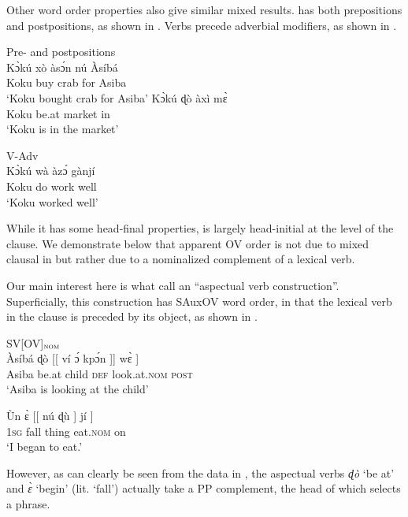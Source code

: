 \documentclass[output=paper,newtxmath,modfonts,nonflat,draftmode]{langsci/langscibook}
\begin{document}
Other word order properties also give similar mixed results.  has both prepositions and postpositions, as shown in . Verbs precede adverbial modifiers, as shown in . 

\ea
\ea \label{ex:Fongbe-PP} {Pre- and postpositions}\\
 \gll K{\`ɔ}kú xò às{\'ɔ}n nú  Àsíbá \\
Koku buy crab for Asiba \\
\glt `Koku bought crab for Asiba' \hfill \citep[][302]{lefebvre2002}
\ex \gll K{\`ɔ}kú ɖò àxì m{\`ɛ}\\
Koku be.at market in \\
\glt `Koku is in the market' \hfill \citep[][325]{lefebvre2002}
\z
\z

\ea \label{ex:Fongbe-Adv}
{V-Adv}\\
\gll K{{\`ɔ}kú} wà {àz{\'ɔ}} gànjí \\
Koku do work well \\
\glt `Koku worked well' \hfill \citep[][381]{lefebvre2002}
\z

While it has some head-final properties,  is largely head-initial at the level of the clause. We demonstrate below that apparent OV order is not due to mixed clausal  in  but rather due to a nominalized complement of a lexical verb.

Our main interest here is what \citet{lefebvre2002} call an ``aspectual verb construction''. Superficially, this construction has SAuxOV word order, in that the lexical verb in the clause is preceded by its object, as shown in . 

\ea \label{ex:Fongbe-SVOV} {SV[OV]$_{\textsc{nom}}$}\\
\ea \gll Àsíbá  {ɖò} [[ ví {\'ɔ}  {kp{\'ɔ}n} ]] {w{\`ɛ}} ]  \\
Asiba be.at {} child \textsc{def} look.at.\textsc{nom} {} \textsc{post}  \\
\glt `Asiba is looking at the child' \hfill \citep[][215]{lefebvre2002}

\ex \label{ex:Fongbe-SVOVa} \gll Ùn {\`ɛ} [[  {nú}  {ɖù}  ] jí ]  \\
1\textsc{sg} fall {} thing eat.\textsc{nom} {} on  \\
\glt `I began to eat.' \hfill \citep[][215]{lefebvre2002}
\z
\z

However, as can clearly be seen from the data in , the aspectual verbs \textit{{ɖò}} `be at' and \textit{{\`ɛ}} `begin' (lit. `fall') actually take a PP complement, the head of which selects a  phrase. 
\end{document}
